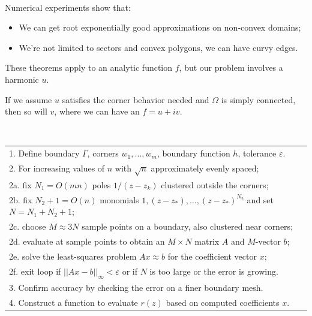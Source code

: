 \documentclass{seminar}
\begin{document}
\begin{slide} %
{} \small \\

Numerical experiments show that:
\begin{itemize}
	\item We can get root exponentially good approximations on non-convex domains;
	\item We're not limited to sectors and convex polygons, we can have curvy edges.\\
\end{itemize}

These theorems apply to an analytic function $f$, but our problem involves a harmonic $u$. 

If we assume $u$ satisfies the corner behavior needed and $\Omega$ is simply connected, then so will $v$, where we can have an $f=u+iv$.
\end{slide} %




\begin{slide} %
{} \small \\
\begin{table}[h]
	\begin{tabular}{l}
		1. Define boundary $\Gamma$, corners $w_1,\ldots, w_m$, boundary function $h$, tolerance $\varepsilon$.	\\
		2. For increasing values of $n$ with $\sqrt{n}$	approximately evenly spaced; \\
		\: 2a. fix $N_1=O(mn)$ poles $1/(z-z_k)$ clustered outside the corners; \\
		\: 2b. fix $N_2+1=O(n)$ monomials $1,(z-z_*),\ldots,(z-z_*)^{N_2}$ and set $N=N_1+N_2+1$; \\
		\: 2c. choose $M\approx 3N$ sample points on a boundary, also clustered near corners; \\
		\: 2d. evaluate at sample points to obtain an $M\times N$ matrix $A$ and $M$-vector $b$; \\
		\: 2e. solve the least-squares problem $Ax\approx b$ for the coefficient vector $x$; \\
		\: 2f. exit loop if $||Ax-b||_\infty < \varepsilon$ or if $N$ is too large or the error is growing. \\
		3. Confirm accuracy by checking the error on a finer boundary mesh. \\
		4. Construct a function to evaluate $r(z)$ based on computed coefficients $x$.
	\end{tabular}
\end{table}
\end{slide} %
\end{document}
